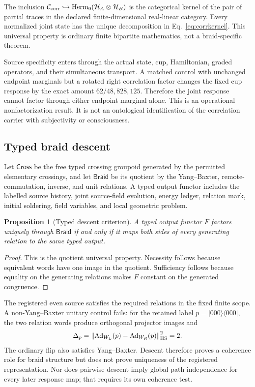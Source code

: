 \documentclass[12pt,a4paper,twoside]{article}
\newtheorem{proposition}{Proposition}
\begin{document}
The inclusion $\mathcal C_{\rm corr}\hookrightarrow\operatorname{Herm}_0(\mathcal H_A\otimes\mathcal H_B)$ is the categorical kernel of the pair of partial traces in the declared finite-dimensional real-linear category. Every normalized joint state has the unique decomposition in Eq.~\eqref{eq:corrkernel}. This universal property is ordinary finite bipartite mathematics, not a braid-specific theorem.

Source specificity enters through the actual state, cup, Hamiltonian, graded operators, and their simultaneous transport. A matched control with unchanged endpoint marginals but a rotated right correlation factor changes the fixed cup response by the exact amount $62/48{,}828{,}125$. Therefore the joint response cannot factor through either endpoint marginal alone. This is an operational nonfactorization result. It is not an ontological identification of the correlation carrier with subjectivity or consciousness.

\subsection{Typed braid descent}

Let $\mathsf{Cross}$ be the free typed crossing groupoid generated by the permitted elementary crossings, and let $\mathsf{Braid}$ be its quotient by the Yang--Baxter, remote-commutation, inverse, and unit relations. A typed output functor includes the labelled source history, joint source-field evolution, energy ledger, relation mark, initial soldering, field variables, and local geometric problem.

\begin{proposition}[Typed descent criterion]
A typed output functor $F$ factors uniquely through $\mathsf{Braid}$ if and only if it maps both sides of every generating relation to the same typed output.
\end{proposition}

\begin{proof}
This is the quotient universal property. Necessity follows because equivalent words have one image in the quotient. Sufficiency follows because equality on the generating relations makes $F$ constant on the generated congruence.
\end{proof}

The registered even source satisfies the required relations in the fixed finite scope. A non-Yang--Baxter unitary control fails: for the retained label $p=|000\rangle\langle000|$, the two relation words produce orthogonal projector images and
\begin{equation}
\Delta_p=\left\|\operatorname{Ad}_{W_L}(p)-\operatorname{Ad}_{W_R}(p)\right\|_{\rm HS}^2=2.
\end{equation}
The ordinary flip also satisfies Yang--Baxter. Descent therefore proves a coherence role for braid structure but does not prove uniqueness of the registered representation. Nor does pairwise descent imply global path independence for every later response map; that requires its own coherence test.
\end{document}
